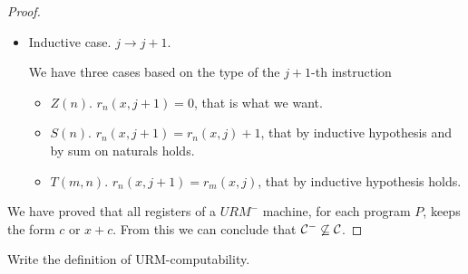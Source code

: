 \documentclass[12pt,a4paper,oneside]{book}
\begin{document}
\begin{exercise}
\begin{proof}
\begin{itemize}
            \item Inductive case. $j \to j + 1$.

            We have three cases based on the type of the $j+1$-th
            instruction
            \begin{itemize}
                \item $Z(n)$. $r_n(x, j+1) = 0$, that is what we want.
                \item $S(n)$. $r_n(x, j+1) = r_n(x, j) + 1$, that by
                  inductive hypothesis and by sum on naturals holds.
                \item $T(m, n)$. $r_n(x, j + 1) = r_m(x, j)$, that by
                  inductive hypothesis holds.
            \end{itemize}
        \end{itemize}

        We have proved that all registers of a $URM^-$ machine, for
        each program $P$, keeps the form $c$ or $x + c$. From this we
        can conclude that $\mathcal{C}^- \not\subseteq \mathcal{C}$.
    \end{proof}

\end{exercise}

\begin{exercise}
    Write the definition of URM-computability.
\end{exercise}
\end{document}
